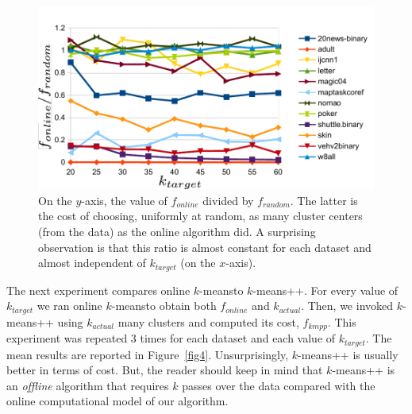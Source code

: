 \documentclass[11pt,twoside]{article}
\newcommand{\kmeans}{$k$-means}
\begin{document}
\begin{figure}[htbp]
\begin{center}
\includegraphics{figures/plot3.pdf}
\caption{On the $y$-axis, the value of $f_{online}$ divided by $f_{random}$. 
The latter is the cost of choosing, uniformly at random, as many cluster centers (from the data) as the online algorithm did.
A surprising observation is that this ratio is almost constant for each dataset and almost independent of $k_{target}$ (on the $x$-axis).}
\label{fig3}
\end{center}
\end{figure}

The next experiment compares online \kmeans to \kmeans++.
For every value of $k_{target}$ we ran online \kmeans to obtain both $f_{online}$ and $k_{actual}$.
Then, we invoked \kmeans++ using $k_{actual}$ many clusters and computed its cost, $f_{kmpp}$.
This experiment was repeated $3$ times for each dataset and each value of $k_{target}$.
The mean results are reported in Figure~\ref{fig4}. 
Unsurprisingly, \kmeans++ is usually better in terms of cost. But, the reader should keep in mind that
\kmeans++ is an \emph{offline} algorithm that requires $k$ passes over the data compared with the online computational model of our algorithm.
\end{document}
